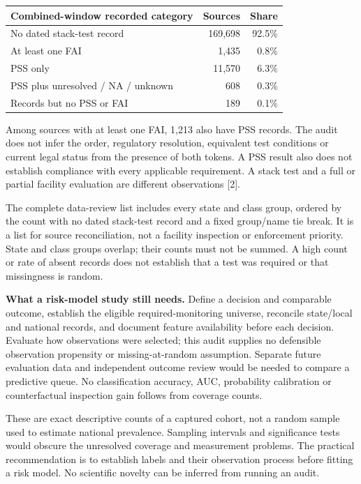 \documentclass[10pt,letterpaper]{article}
\begin{document}
\begin{center}\small\begin{tabular}{lrr}\toprule
Combined-window recorded category & Sources & Share\\\midrule
No dated stack-test record & 169,698 & 92.5\% \\
At least one FAI & 1,435 & 0.8\% \\
PSS only & 11,570 & 6.3\% \\
PSS plus unresolved / NA / unknown & 608 & 0.3\% \\
Records but no PSS or FAI & 189 & 0.1\% \\
\bottomrule\end{tabular}\end{center}

Among sources with at least one FAI, 1,213 also have PSS records. The audit does not infer the order, regulatory resolution, equivalent test conditions or current legal status from the presence of both tokens. A PSS result also does not establish compliance with every applicable requirement. A stack test and a full or partial facility evaluation are different observations [2].

The complete data-review list includes every state and class group, ordered by the count with no dated stack-test record and a fixed group/name tie break. It is a list for source reconciliation, not a facility inspection or enforcement priority. State and class groups overlap; their counts must not be summed. A high count or rate of absent records does not establish that a test was required or that missingness is random.

\textbf{What a risk-model study still needs.} Define a decision and comparable outcome, establish the eligible required-monitoring universe, reconcile state/local and national records, and document feature availability before each decision. Evaluate how observations were selected; this audit supplies no defensible observation propensity or missing-at-random assumption. Separate future evaluation data and independent outcome review would be needed to compare a predictive queue. No classification accuracy, AUC, probability calibration or counterfactual inspection gain follows from coverage counts.

These are exact descriptive counts of a captured cohort, not a random sample used to estimate national prevalence. Sampling intervals and significance tests would obscure the unresolved coverage and measurement problems. The practical recommendation is to establish labels and their observation process before fitting a risk model. No scientific novelty can be inferred from running an audit.
\end{document}
